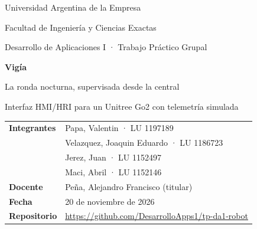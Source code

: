 \begin{titlepage}
\pagecolor{noche}\color{white}
\renewcommand{\pendiente}[1]{\textcolor{ambar}{[#1]}}
\vspace*{1.5cm}
{\large Universidad Argentina de la Empresa\par Facultad de Ingeniería y Ciencias Exactas\par}
\vspace{0.4cm}
{\large Desarrollo de Aplicaciones I · Trabajo Práctico Grupal\par}

\vspace{4cm}
{\fontsize{46}{50}\selectfont\bfseries Vigía\par}
\vspace{0.3cm}
{\LARGE\color{ambar} La ronda nocturna, supervisada desde la central\par}
\vspace{0.8cm}
{\Large Interfaz HMI/HRI para un Unitree Go2 con telemetría simulada\par}

\vfill
\begin{tabular}{@{}ll@{}}
\textbf{Integrantes} & Papa, Valentin · LU 1197189 \\
                     & Velazquez, Joaquin Eduardo · LU 1186723 \\
                     & Jerez, Juan · LU 1152497 \\
                     & Maci, Abril · LU 1152146 \\
\textbf{Docente}     & Peña, Alejandro Francisco (titular) \\
\textbf{Fecha}       & 20 de noviembre de 2026 \\
\textbf{Repositorio} & \url{https://github.com/DesarrolloApps1/tp-da1-robot} \\
\end{tabular}
\end{titlepage}
\nopagecolor\color{black}

\tableofcontents
\newpage

